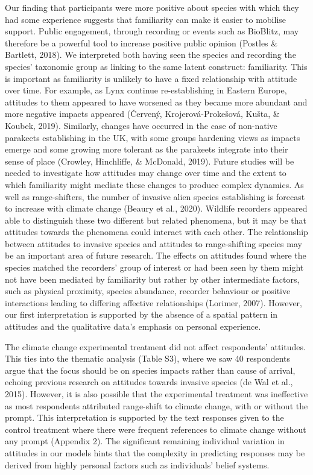 \documentclass[
]{article}
\begin{document}
Our finding that participants were more positive about species with
which they had some experience suggests that familiarity can make it
easier to mobilise support. Public engagement, through recording or
events such as BioBlitz, may therefore be a powerful tool to increase
positive public opinion (Postles \& Bartlett, 2018). We interpreted both
having seen the species and recording the species' taxonomic group as
linking to the same latent construct: familiarity. This is important as
familiarity is unlikely to have a fixed relationship with attitude over
time. For example, as Lynx continue re-establishing in Eastern Europe,
attitudes to them appeared to have worsened as they became more abundant
and more negative impacts appeared (Červený, Krojerová-Prokešová, Kušta,
\& Koubek, 2019). Similarly, changes have occurred in the case of
non-native parakeets establishing in the UK, with some groups hardening
views as impacts emerge and some growing more tolerant as the parakeets
integrate into their sense of place (Crowley, Hinchliffe, \& McDonald,
2019). Future studies will be needed to investigate how attitudes may
change over time and the extent to which familiarity might mediate these
changes to produce complex dynamics. As well as range-shifters, the
number of invasive alien species establishing is forecast to increase
with climate change (Beaury et al., 2020). Wildlife recorders appeared
able to distinguish these two different but related phenomena, but it
may be that attitudes towards the phenomena could interact with each
other. The relationship between attitudes to invasive species and
attitudes to range-shifting species may be an important area of future
research. The effects on attitudes found where the species matched the
recorders' group of interest or had been seen by them might not have
been mediated by familiarity but rather by other intermediate factors,
such as physical proximity, species abundance, recorder behaviour or
positive interactions leading to differing affective relationships
(Lorimer, 2007). However, our first interpretation is supported by the
absence of a spatial pattern in attitudes and the qualitative data's
emphasis on personal experience.

The climate change experimental treatment did not affect respondents'
attitudes. This ties into the thematic analysis (Table S3), where we saw
40 respondents argue that the focus should be on species impacts rather
than cause of arrival, echoing previous research on attitudes towards
invasive species (de Wal et al., 2015). However, it is also possible
that the experimental treatment was ineffective as most respondents
attributed range-shift to climate change, with or without the prompt.
This interpretation is supported by the text responses given to the
control treatment where there were frequent references to climate change
without any prompt (Appendix 2). The significant remaining individual
variation in attitudes in our models hints that the complexity in
predicting responses may be derived from highly personal factors such as
individuals' belief systems.
\end{document}
